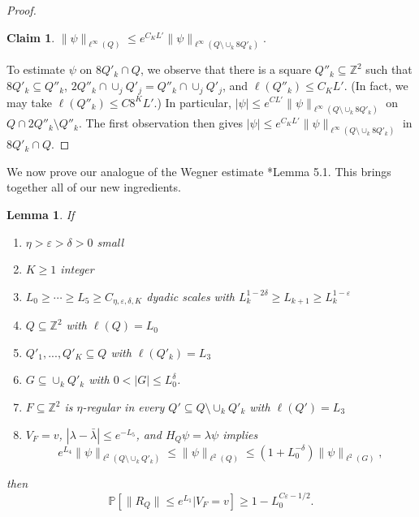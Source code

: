 \documentclass{amsart}
\newtheorem{lemma}[equation]{Lemma}
\newtheorem{claim}[equation]{Claim}
\numberwithin{equation}{section}
\numberwithin{figure}{section}
\newcommand{\Z}{\mathbb{Z}}
\renewcommand{\P}{\mathbb{P}}
\newcommand{\ep}{\varepsilon}
\begin{document}
\begin{proof}
\begin{claim}
$\| \psi \|_{\ell^\infty(Q)} \leq e^{C_K L'} \| \psi \|_{\ell^\infty(Q \setminus \cup_k 8 Q'_k)}.$
\end{claim}

To estimate $\psi$ on $8 Q'_k \cap Q$, we observe that there is a square $Q''_k \subseteq \Z^2$ such that $8 Q'_k \subseteq Q''_k$, $2 Q''_k \cap \cup_j Q'_j = Q''_k \cap \cup_j Q'_j$, and $\ell(Q''_k) \leq C_K L'$.  (In fact, we may take $\ell(Q''_k) \leq C 8^K L'$.)  In particular, $|\psi| \leq e^{C L'} \| \psi \|_{\ell^\infty(Q \setminus \cup_k 8 Q'_k)}$ on $Q \cap 2 Q''_k \setminus Q''_k$.  The first observation then gives $|\psi| \leq e^{C_K L'} \| \psi \|_{\ell^\infty(Q \setminus \cup_k 8 Q'_k)}$ in $8 Q'_k \cap Q$.
\end{proof}

We now prove our analogue of the Wegner estimate  \cite{Bourgain-Kenig}*{Lemma 5.1}.  This brings together all of our new ingredients.

\begin{lemma}
\label{l.wegner}
If
\begin{enumerate}
\item $\eta > \ep > \delta > 0$ small
\item $K \geq 1$ integer
\item $L_0 \geq \cdots \geq L_5 \geq C_{\eta,\ep,\delta,K}$ dyadic scales with $L_k^{1-2\delta} \geq L_{k+1} \geq L_k^{1-\ep}$
\item $Q \subseteq \Z^2$ with $\ell(Q) = L_0$
\item $Q'_1, ..., Q'_K \subseteq Q$ with $\ell(Q'_k) = L_3$
\item $G \subseteq \cup_k Q'_k$ with $0 < |G| \leq L_0^{\delta}$.
\item $F \subseteq \Z^2$ is $\eta$-regular in every $Q' \subseteq Q \setminus \cup_k Q'_k$ with $\ell(Q') = L_3$
\item $V_F = v$, $|\lambda - \bar \lambda| \leq e^{-L_5}$, and $H_Q \psi = \lambda \psi$ implies
\begin{equation*}
e^{L_4} \| \psi \|_{\ell^2(Q \setminus \cup_k Q'_k)} \leq \| \psi \|_{\ell^2(Q)} \leq (1 + L_0^{-\delta}) \| \psi \|_{\ell^2(G)},
\end{equation*}
\end{enumerate}
then
\begin{equation*}
\P[\| R_Q \| \leq e^{L_1} | V_F = v] \geq 1 - L_0^{C \ep - 1/2}.
\end{equation*}
\end{lemma}
\end{document}
